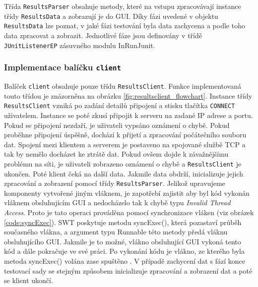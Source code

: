 

      Třída \texttt{ResultsParser} obsahuje metody, které na vstupu zpracovávají instance třídy \texttt{ResultsData} a zobrazují je do GUI. Díky fázi uvedené v objektu \texttt{ResultsData} lze poznat, v jaké fázi testování byla data zachycena a podle toho data zpracovat a zobrazit. Jednotlivé fáze jsou definovány v třídě \texttt{JUnitListenerEP} zásuvného modulu InRunJunit.
      

      \subsubsection{Implementace balíčku \texttt{client}}
      Balíček \texttt{client} obsahuje pouze třídu \texttt{ResultsClient}. Funkce implementovaná touto třídou je znázorněna na obrázku \ref{fig:resultsclient_flowchart}. Instance třídy \texttt{ResultsClient} vzniká po zadání detailů připojení a stisku tlačítka \texttt{CONNECT} uživatelem. Instance se poté zkusí připojit k serveru na zadané IP adrese a portu. Pokud se připojení nezdaří, je uživateli vypsáno oznámení o chybě. Pokud proběhne připojení úspěšně, dochází k přijetí a zpracování počátečního souboru dat. Spojení mezi klientem a serverem je postaveno na spojované službě TCP a tak by nemělo docházet ke ztrátě dat. Pokud ovšem dojde k závažnějšímu problému na síti, je uživateli zobrazeno oznámení o chybě a \texttt{ResultsClient} je ukončen. Poté klient čeká na další data. Jakmile data obdrží, inicializuje jejich zpracování a zobrazení pomocí třídy \texttt{ResultsParser}. Jelikož upravujeme komponenty vytvořené jiným vláknem, je zapotřebí zajistit aby byl kód vykonán vláknem obsluhujícím GUI a nedocházelo tak k chybě typu \emph{Invalid Thread Access}. Proto je tato operaci prováděna pomocí synchronizace vláken (viz obrázek \ref{code:syncExec}). SWT poskytuje metodu syncExec(), která pozastaví průběh současného vlákna, a argument typu Runnable této metody předá vláknu obsluhujícího GUI. Jakmile je to možné, vlákno obsluhující GUI vykoná tento kód a dále pokračuje ve své práci. Po vykonání kódu je vlákno, ze kterého byla metoda syncExec() volána zase spuštěno \cite{codeaffine-asyncexec}. V případě zachycení dat s fází konce testovací sady se stejným způsobem inicializuje zpracování a zobrazení dat a poté se klient ukončí.
      
